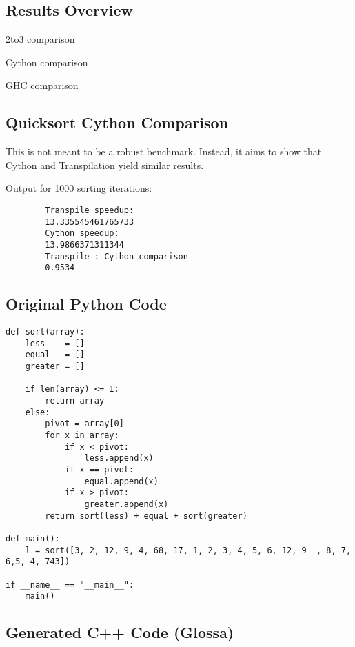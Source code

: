 \documentclass{article}
\begin{document}
\subsection{Results Overview}

2to3 comparison

Cython comparison

GHC comparison

\subsection{Quicksort Cython Comparison}

This is not meant to be a robust benchmark. Instead, it aims to show that Cython and Transpilation yield similar results.

Output for 1000 sorting iterations:
\begin{center}
    \begin{verbatim}
        Transpile speedup:
        13.335545461765733
        Cython speedup:
        13.9866371311344
        Transpile : Cython comparison 
        0.9534
    \end{verbatim}
\end{center}

\newpage
\subsection{Original Python Code}

\lstset{language=Python}
\begin{lstlisting}
def sort(array):
    less    = []
    equal   = []
    greater = []

    if len(array) <= 1:
        return array
    else:
        pivot = array[0]
        for x in array:
            if x < pivot:
                less.append(x)
            if x == pivot:
                equal.append(x)
            if x > pivot:
                greater.append(x)
        return sort(less) + equal + sort(greater)

def main():
    l = sort([3, 2, 12, 9, 4, 68, 17, 1, 2, 3, 4, 5, 6, 12, 9  , 8, 7, 6,5, 4, 743])

if __name__ == "__main__":
    main()
\end{lstlisting}

\lstset{language=C}

\newpage
\subsection{Generated C++ Code (Glossa)}
\end{document}

